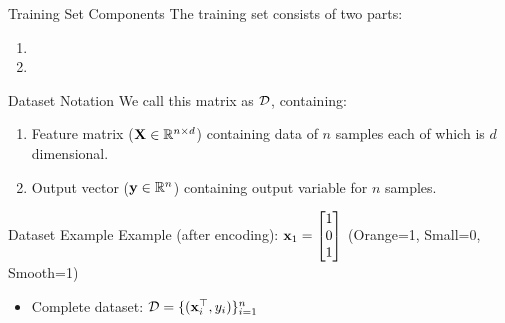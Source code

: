 \documentclass[usenames,dvipsnames]{beamer}
\begin{document}
\begin{frame}{Training Set Components}
The training set consists of two parts:
\begin{enumerate}
	\item \pause \color{Lavender}{Features (Input Variables)}
	\item \pause \color{Tan}{Output or Response Variable}
\end{enumerate}
\end{frame}

\begin{frame}{Dataset Notation}
We call this matrix as $\mathcal{D}$, containing:
\begin{enumerate}
	\item Feature matrix ($\mathbf{X} \in \mathbb{R}^{n \times d}$) containing data of $n$ samples each of which is $d$ dimensional.
	\item Output vector ($\mathbf{y} \in \mathbb{R}^n$) containing output variable for $n$ samples.
\end{enumerate}

\end{frame}

\begin{frame}{Dataset Example}
Example (after encoding): $\mathbf{x}_1 = \begin{bmatrix}
	1 \\ 
	0 \\
	1 \\
	\end{bmatrix}$ (Orange=1, Small=0, Smooth=1)

\begin{itemize}
	\item \pause Complete dataset: $\mathcal{D} = \{(\mathbf{x}_i^\top, y_i)\}_{i=1}^n$
\end{itemize}

\end{frame}
\end{document}
